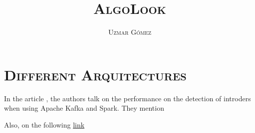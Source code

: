 \documentclass[10pt,letterpaper]{article}
\title{{\scshape\huge AlgoLook}}
\author{{\scshape\Large Uzmar Gómez}}
\newcommand{\ssection}[1]{%
  \section*{\normalfont\scshape #1}}
\begin{document}
\maketitle






\ssection{Different Arquitectures}

In the article \cite{Tun2019b}, the authors talk on the performance on the detection of introders when using Apache Kafka and Spark. They mention

Also, on the following \href{https://www.infoq.com/articles/video-stream-analytics-opencv/}{link}



\end{document}
